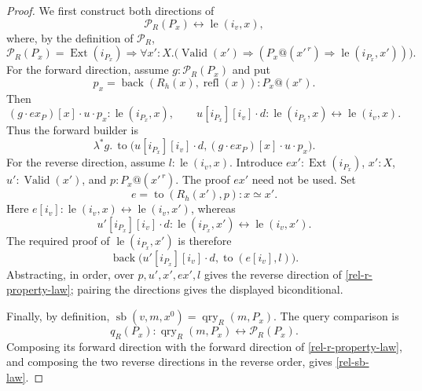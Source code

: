 \begin{proof}
We first construct both directions of
\begin{equation}
 \mathcal P_R(P_x)\leftrightarrow\operatorname{le}(i_v,x),
 \label{rel-r-property-law}
\end{equation}
where, by the definition of $\mathcal P_R$,
\[
 \mathcal P_R(P_x)=\operatorname{Ext}(i_{P_x})\Rightarrow
 \forall x':X.\bigl(\operatorname{Valid}(x')\Rightarrow
 (P_x@(x'^{\,r})\Rightarrow\operatorname{le}(i_{P_x},x'))\bigr).
\]
For the forward direction, assume $g:\mathcal P_R(P_x)$ and put
\[
 p_x=\operatorname{back}(R_h(x),\operatorname{refl}(x))
           :P_x@(x^r).
\]
Then
\[
 (g\cdot ex_P)[x]\cdot u\cdot p_x
      :\operatorname{le}(i_{P_x},x),
 \qquad
 u[i_{P_x}][i_v]\cdot d:
      \operatorname{le}(i_{P_x},x)\leftrightarrow
      \operatorname{le}(i_v,x).
\]
Thus the forward builder is
\[
 \lambda^*g.\,
 \operatorname{to}\bigl(u[i_{P_x}][i_v]\cdot d,
                      (g\cdot ex_P)[x]\cdot u\cdot p_x\bigr).
\]
For the reverse direction, assume $l:\operatorname{le}(i_v,x)$.
Introduce $ex':\operatorname{Ext}(i_{P_x})$, $x':X$,
$u':\operatorname{Valid}(x')$, and $p:P_x@(x'^{\,r})$.
The proof $ex'$ need not be used.  Set
\[
 e=\operatorname{to}(R_h(x'),p):x\simeq x'.
\]
Here $e[i_v]:\operatorname{le}(i_v,x)\leftrightarrow
\operatorname{le}(i_v,x')$, whereas
\[
 u'[i_{P_x}][i_v]\cdot d:
 \operatorname{le}(i_{P_x},x')\leftrightarrow
 \operatorname{le}(i_v,x').
\]
The required proof of $\operatorname{le}(i_{P_x},x')$ is therefore
\[
 \operatorname{back}\bigl(u'[i_{P_x}][i_v]\cdot d,
                         \operatorname{to}(e[i_v],l)\bigr).
\]
Abstracting, in order, over $p,u',x',ex',l$ gives the reverse
direction of \eqref{rel-r-property-law}; pairing the directions gives
the displayed biconditional.

Finally, by definition,
$\operatorname{sb}(v,m,x^0)=\operatorname{qry}_R(m,P_x)$.
The query comparison is
\[
 q_R(P_x):\operatorname{qry}_R(m,P_x)
                         \leftrightarrow\mathcal P_R(P_x).
\]
Composing its forward direction with the forward direction of
\eqref{rel-r-property-law}, and composing the two reverse directions
in the reverse order, gives \eqref{rel-sb-law}.
\end{proof}

